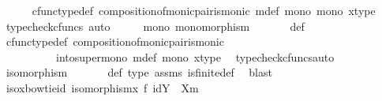 \begin{isabellebody}
\ \ \ \ \isamarkupfalse%
\ cfunc{\isacharunderscore}{\kern0pt}type{\isacharunderscore}{\kern0pt}def\ composition{\isacharunderscore}{\kern0pt}of{\isacharunderscore}{\kern0pt}monic{\isacharunderscore}{\kern0pt}pair{\isacharunderscore}{\kern0pt}is{\isacharunderscore}{\kern0pt}monic\ m{\isacharunderscore}{\kern0pt}def\ mono{}\ mono{}\ x{\isacharunderscore}{\kern0pt}type\ \isamarkupfalse%
\ {\isacharparenleft}{\kern0pt}typecheck{\isacharunderscore}{\kern0pt}cfuncs{\isacharcomma}{\kern0pt}\ auto{\isacharparenright}{\kern0pt}\isanewline
\ \ \isamarkupfalse%
\ \isamarkupfalse%
\ {\isasymphi}{\isacharunderscore}{\kern0pt}mono{\isacharcolon}{\kern0pt}\ {\isachardoublequoteopen}monomorphism{\isacharparenleft}{\kern0pt}{\isasymphi}{\isacharparenright}{\kern0pt}{\isachardoublequoteclose}\ \isanewline
\ \ \ \ \isamarkupfalse%
\ {\isasymphi}{\isacharunderscore}{\kern0pt}def\isanewline
\ \ \ \ \isamarkupfalse%
\ cfunc{\isacharunderscore}{\kern0pt}type{\isacharunderscore}{\kern0pt}def\ composition{\isacharunderscore}{\kern0pt}of{\isacharunderscore}{\kern0pt}monic{\isacharunderscore}{\kern0pt}pair{\isacharunderscore}{\kern0pt}is{\isacharunderscore}{\kern0pt}monic\ \isanewline
\ \ \ \ \ \ \ \ \ \ into{\isacharunderscore}{\kern0pt}super{\isacharunderscore}{\kern0pt}mono\ m{\isacharunderscore}{\kern0pt}def\ mono{}\ x{\isacharunderscore}{\kern0pt}type\ \isamarkupfalse%
\ {\isacharparenleft}{\kern0pt}typecheck{\isacharunderscore}{\kern0pt}cfuncs{\isacharcomma}{\kern0pt}auto{\isacharparenright}{\kern0pt}\isanewline
\ \ \isamarkupfalse%
\ \isamarkupfalse%
\ {\isachardoublequoteopen}isomorphism{\isacharparenleft}{\kern0pt}{\isasymphi}{\isacharparenright}{\kern0pt}{\isachardoublequoteclose}\ \isanewline
\ \ \ \ \isamarkupfalse%
\ {\isasymphi}{\isacharunderscore}{\kern0pt}def\ {\isasymphi}{\isacharunderscore}{\kern0pt}type\ assms{\isacharparenleft}{\kern0pt}{}{\isacharparenright}{\kern0pt}\ is{\isacharunderscore}{\kern0pt}finite{\isacharunderscore}{\kern0pt}def\ \isamarkupfalse%
\ blast\isanewline
\ \ \isamarkupfalse%
\ iso{\isacharunderscore}{\kern0pt}x{\isacharunderscore}{\kern0pt}bowtie{\isacharunderscore}{\kern0pt}id{\isacharcolon}{\kern0pt}\ {\isachardoublequoteopen}isomorphism{\isacharparenleft}{\kern0pt}x\ {\isasymbowtie}\isactrlsub f\ id{\isacharparenleft}{\kern0pt}Y\ {\isasymsetminus}\ {\isacharparenleft}{\kern0pt}X{\isacharcomma}{\kern0pt}m{\isacharparenright}{\kern0pt}{\isacharparenright}{\kern0pt}{\isacharparenright}{\kern0pt}{\isachardoublequoteclose}\isanewline

\end{isabellebody}

